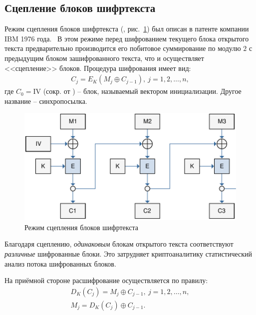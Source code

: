\subsection{Сцепление блоков шифртекста}

Режим сцепления блоков шифртекста (, рис.~\ref{fig:CBC}) был описан в патенте компании IBM 1976 года.~\cite{Ehrsam:Meyer:Smith:Tuchman:1976} В этом режиме перед шифрованием текущего блока открытого текста предварительно производится его побитовое суммирование по модулю $2$ с предыдущим блоком зашифрованного текста, что и осуществляет <<сцепление>> блоков. Процедура шифрования имеет вид:
\[ \begin{array}{l}
    C_j = E_K(M_j \oplus C_{j-1}), ~ j = 1, 2, \dots, n,
\end{array} \]
где $C_0 = \textrm{IV}$ (сокр. от ) -- блок, называемый вектором инициализации. Другое название -- синхропосылка.

\begin{figure}[bt]
	\centering
	\includegraphics[width=1\textwidth]{pic/CBC}
	\caption{Режим сцепления блоков шифртекста}
	\label{fig:CBC}
\end{figure}

Благодаря сцеплению, \emph{одинаковым} блокам открытого текста соответствуют \emph{различные} шифрованные блоки. Это затрудняет криптоаналитику статистический анализ потока шифрованных блоков.

На приёмной стороне расшифрование осуществляется по правилу:
\[ \begin{array}{l}
    D_K(C_j) = M_j \oplus C_{j-1}, ~ j=1, 2, \dots, n,\\
    M_{j} = D_K(C_j) \oplus C_{j-1}.
\end{array} \]

